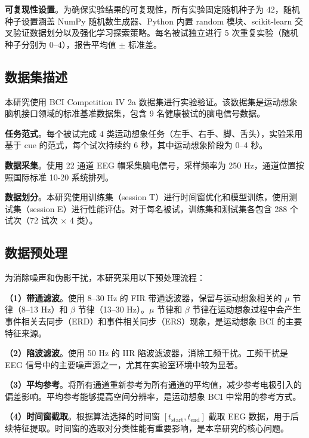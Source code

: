 \textbf{可复现性设置}。为确保实验结果的可复现性，所有实验固定随机种子为 42，随机种子设置涵盖 NumPy 随机数生成器、Python 内置 random 模块、scikit-learn 交叉验证数据划分以及强化学习探索策略。每名被试独立进行 5 次重复实验（随机种子分别为 0--4），报告平均值 $\pm$ 标准差。

\subsection{数据集描述}
\label{subsec:dataset}

本研究使用 BCI Competition IV 2a 数据集进行实验验证\cite{tangermann2012review}。该数据集是运动想象脑机接口领域的标准基准数据集，包含 9 名健康被试的脑电信号数据。

\textbf{任务范式}。每个被试完成 4 类运动想象任务（左手、右手、脚、舌头），实验采用基于 cue 的范式，每个试次持续约 6 秒，其中运动想象阶段为 0--4 秒。

\textbf{数据采集}。使用 22 通道 EEG 帽采集脑电信号，采样频率为 250 Hz，通道位置按照国际标准 10-20 系统排列。

\textbf{数据划分}。本研究使用训练集（session T）进行时间窗优化和模型训练，使用测试集（session E）进行性能评估。对于每名被试，训练集和测试集各包含 288 个试次（72 试次 $\times$ 4 类）。

\subsection{数据预处理}
\label{subsec:preprocessing}

为消除噪声和伪影干扰，本研究采用以下预处理流程\cite{delorme2004eeglab}：

\textbf{（1）带通滤波}。使用 8--30 Hz 的 FIR 带通滤波器，保留与运动想象相关的 $\mu$ 节律（8--13 Hz）和 $\beta$ 节律（13--30 Hz）。$\mu$ 节律和 $\beta$ 节律在运动想象过程中会产生事件相关去同步（ERD）和事件相关同步（ERS）现象，是运动想象 BCI 的主要特征来源\cite{pfurtscheller1999event}。

\textbf{（2）陷波滤波}。使用 50 Hz 的 IIR 陷波滤波器，消除工频干扰。工频干扰是 EEG 信号中的主要噪声源之一，尤其在实验室环境中较为显著。

\textbf{（3）平均参考}。将所有通道重新参考为所有通道的平均值，减少参考电极引入的偏差影响。平均参考能够提高空间分辨率，是运动想象 BCI 中常用的参考方式。

\textbf{（4）时间窗截取}。根据算法选择的时间窗 $[t_{\text{start}}, t_{\text{end}}]$ 截取 EEG 数据，用于后续特征提取。时间窗的选取对分类性能有重要影响，是本章研究的核心问题。

